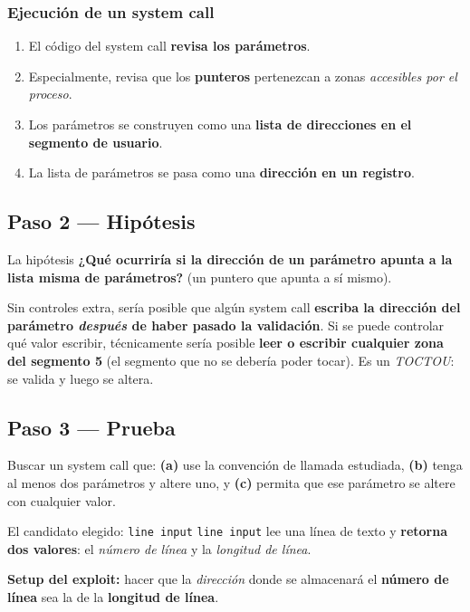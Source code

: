 \documentclass[11pt,a4paper]{article}
\begin{document}
\subsubsection*{Ejecución de un system call}
\begin{enumerate}[leftmargin=1.8em,itemsep=2pt]
  \item El código del system call \textbf{revisa los parámetros}.
  \item Especialmente, revisa que los \textbf{punteros} pertenezcan a zonas \emph{accesibles
        por el proceso}.
  \item Los parámetros se construyen como una \textbf{lista de direcciones en el segmento de
        usuario}.
  \item La lista de parámetros se pasa como una \textbf{dirección en un registro}.
\end{enumerate}

\subsection{Paso 2 — Hipótesis}

\begin{defbox}{La hipótesis}
\textbf{¿Qué ocurriría si la dirección de un parámetro apunta a la lista misma de
parámetros?} (un puntero que apunta a sí mismo).

Sin controles extra, sería posible que algún system call \textbf{escriba la dirección del
parámetro \emph{después} de haber pasado la validación}. Si se puede controlar qué valor
escribir, técnicamente sería posible \textbf{leer o escribir cualquier zona del segmento 5}
(el segmento que no se debería poder tocar). Es un \emph{TOCTOU}: se valida y luego se altera.
\end{defbox}

\subsection{Paso 3 — Prueba}

Buscar un system call que: \textbf{(a)} use la convención de llamada estudiada, \textbf{(b)}
tenga al menos dos parámetros y altere uno, y \textbf{(c)} permita que ese parámetro se altere
con cualquier valor.

\begin{notebox}{El candidato elegido: \texttt{line input}}
\texttt{line input} lee una línea de texto y \textbf{retorna dos valores}: el \emph{número de
línea} y la \emph{longitud de línea}.

\textbf{Setup del exploit:} hacer que la \emph{dirección} donde se almacenará el
\textbf{número de línea} sea la de la \textbf{longitud de línea}.
\end{notebox}
\end{document}
